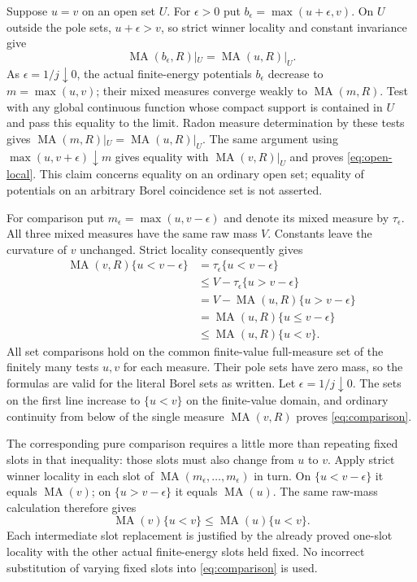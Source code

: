 \documentclass[11pt]{article}
\newcommand{\MA}{\operatorname{MA}}
\begin{document}
Suppose $u=v$ on an open set $U$. For $\epsilon>0$ put
$b_\epsilon=\max(u+\epsilon,v)$.
On $U$ outside the pole sets, $u+\epsilon>v$, so strict winner
locality and constant invariance give
\[
                    \MA(b_\epsilon,R)|_U=\MA(u,R)|_U.
\]
As $\epsilon=1/j\downarrow0$, the actual finite-energy potentials
$b_\epsilon$ decrease to $m=\max(u,v)$; their mixed measures converge
weakly to $\MA(m,R)$. Test with any global continuous function
whose compact support is contained in $U$ and pass this equality
to the limit. Radon measure determination by these tests gives
$\MA(m,R)|_U=\MA(u,R)|_U$. The same argument using
$\max(u,v+\epsilon)\downarrow m$ gives equality with
$\MA(v,R)|_U$ and proves \eqref{eq:open-local}.
This claim concerns equality on an ordinary open set; equality of
potentials on an arbitrary Borel coincidence set is not asserted.

For comparison put $m_\epsilon=\max(u,v-\epsilon)$ and denote its
mixed measure by $\tau_\epsilon$. All three mixed measures have
the same raw mass $V$. Constants leave the curvature of $v$
unchanged. Strict locality consequently gives
\begin{align*}
 \MA(v,R)\{u<v-\epsilon\}
   &=\tau_\epsilon\{u<v-\epsilon\}\\
   &\leq V-\tau_\epsilon\{u>v-\epsilon\}\\
   &=V-\MA(u,R)\{u>v-\epsilon\}\\
   &=\MA(u,R)\{u\leq v-\epsilon\}\\
   &\leq\MA(u,R)\{u<v\}.
\end{align*}
All set comparisons hold on the common finite-value full-measure
set of the finitely many tests $u,v$ for each measure. Their pole
sets have zero mass, so the formulas are valid for the literal
Borel sets as written. Let $\epsilon=1/j\downarrow0$. The sets on
the first line increase to $\{u<v\}$ on the finite-value domain,
and ordinary continuity from below of the single measure
$\MA(v,R)$ proves \eqref{eq:comparison}.

The corresponding pure comparison requires a little more than
repeating fixed slots in that inequality: those slots must also
change from $u$ to $v$. Apply strict winner locality in each slot
of $\MA(m_\epsilon,\ldots,m_\epsilon)$ in turn. On
$\{u<v-\epsilon\}$ it equals $\MA(v)$; on
$\{u>v-\epsilon\}$ it equals $\MA(u)$. The same raw-mass
calculation therefore gives
\[
             \MA(v)\{u<v\}\leq\MA(u)\{u<v\}.
\]
Each intermediate slot replacement is justified by the already
proved one-slot locality with the other actual finite-energy slots
held fixed. No incorrect substitution of varying fixed slots into
\eqref{eq:comparison} is used.
\end{document}
